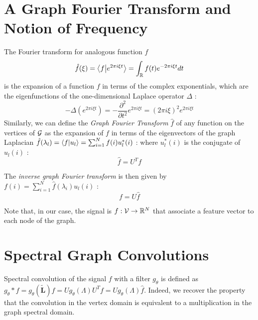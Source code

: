 \documentclass[sigconf]{acmart}
\begin{document}
\section{A Graph Fourier Transform and Notion of Frequency}
The Fourier transform for analogous function $f$
$$
\hat{f}(\xi) = \left \langle f \middle| e^{2\pi i\xi t} \right \rangle = \int_{\mathbb{R}} f(t)e^{-2\pi i \xi t}dt
$$
is the expansion of a function $f$ in terms of the complex exponentials, which are the eigenfunctions of the one-dimensional Laplace operator $\Delta$ :
$$
-\Delta (e^{2\pi i \xi t}) = -\frac{\partial^2}{\partial t^2} e^{2\pi i \xi t} = (2\pi i\xi)^2 e^{2\pi i \xi t}
$$
Similarly, we can define the \textit{Graph Fourier Transform} $\hat{f}$ of any function on the vertices of $\mathcal{G}$ as the expansion of $f$ in terms of the eigenvectors of the graph Laplacian $\hat{f}(\lambda_l) = \left \langle f \middle| u_l \right \rangle = \sum_{i=1}^{N} f(i)u_l^*(i)$ : 
where $u_l^*(i)$ is the conjugate of $u_l(i)$ : 
\begin{equation}
    \hat{f} = U^Tf
\end{equation}

The \textit{inverse graph Fourier transform} is then given by $f(i) = \sum_{i=1}^{N} \hat{f}(\lambda_i)u_l(i)$ : 
\begin{equation}
    f = U\hat{f}
\end{equation}

Note that, in our case, the signal is $f:\mathcal{V}\rightarrow\mathbb{R}^N$ that associate a feature vector to each node of the graph.

\section{Spectral Graph Convolutions }

Spectral convolution of the signal $f$ with a filter $g_\theta$ is defined as $g_\theta * f = g_\theta(\widetilde{\mathbf{L}})f = Ug_\theta(\Lambda)U^Tf = U g_\theta(\Lambda)\hat{f}$. 
Indeed, we recover the property that the convolution in the vertex domain is equivalent to a multiplication in the graph spectral domain.
\end{document}
